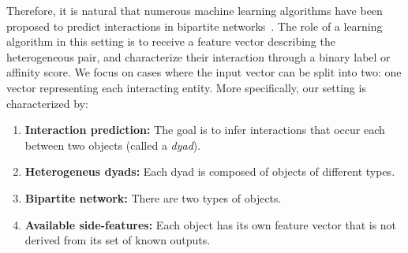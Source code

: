 
Therefore, it is natural that numerous machine learning algorithms have been proposed to predict interactions in bipartite networks~\cite{chen2018machine,ezzat2019computational,bagherian2020machine}. 
The role of a learning algorithm in this setting is to receive a feature vector describing the heterogeneous pair, and characterize their interaction through a binary label or affinity score.
We focus on cases where the input vector can be split into two: one vector representing each interacting entity.
%
More specifically, our setting is characterized by:
%
\begin{enumerate}
    \item \textbf{Interaction prediction:}
        The goal is to infer interactions that occur each between two objects (called a \emph{dyad}).
    \item \textbf{Heterogeneus dyads:}
        Each dyad is composed of objects of different types.
    \item \textbf{Bipartite network:}
        There are two types of objects.
    \item \textbf{Available side-features:}
        Each object has its own feature vector that is not derived from its set of known outputs.
\end{enumerate}

